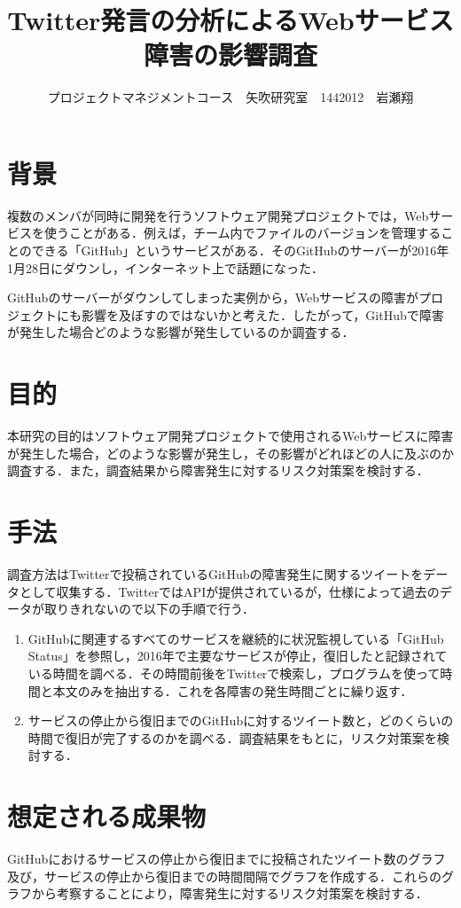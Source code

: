 \documentclass[uplatex,twocolumn,dvipdfmx]{jsarticle}
\title{\vspace{-5mm}\fontsize{14pt}{0pt}\selectfont Twitter発言の分析によるWebサービス障害の影響調査}
\author{\normalsize プロジェクトマネジメントコース　矢吹研究室　1442012　岩瀬翔}
\date{}
\begin{document}
\fontsize{10.5pt}{\baselineskip}\selectfont
\maketitle





\section{背景}
複数のメンバが同時に開発を行うソフトウェア開発プロジェクトでは，Webサービスを使うことがある．例えば，チーム内でファイルのバージョンを管理することのできる「GitHub」というサービスがある\cite{01}．そのGitHubのサーバーが2016年1月28日にダウンし，インターネット上で話題になった\cite{02}．

GitHubのサーバーがダウンしてしまった実例から，Webサービスの障害がプロジェクトにも影響を及ぼすのではないかと考えた．したがって，GitHubで障害が発生した場合どのような影響が発生しているのか調査する．
\section{目的}
本研究の目的はソフトウェア開発プロジェクトで使用されるWebサービスに障害が発生した場合，どのような影響が発生し，その影響がどれほどの人に及ぶのか調査する．また，調査結果から障害発生に対するリスク対策案を検討する．
\section{手法}
調査方法はTwitterで投稿されているGitHubの障害発生に関するツイートをデータとして収集する．TwitterではAPIが提供されているが，仕様によって過去のデータが取りきれないので以下の手順で行う．
\begin{enumerate}
 \item GitHubに関連するすべてのサービスを継続的に状況監視している「GitHub Status」を参照し，2016年で主要なサービスが停止，復旧したと記録されている時間を調べる．その時間前後をTwitterで検索し，プログラムを使って時間と本文のみを抽出する．これを各障害の発生時間ごとに繰り返す\cite{03}．
 \item サービスの停止から復旧までのGitHubに対するツイート数と，どのくらいの時間で復旧が完了するのかを調べる．調査結果をもとに，リスク対策案を検討する．
\end{enumerate}
\section{想定される成果物}
GitHubにおけるサービスの停止から復旧までに投稿されたツイート数のグラフ及び，サービスの停止から復旧までの時間間隔でグラフを作成する．これらのグラフから考察することにより，障害発生に対するリスク対策案を検討する．
\end{document}
